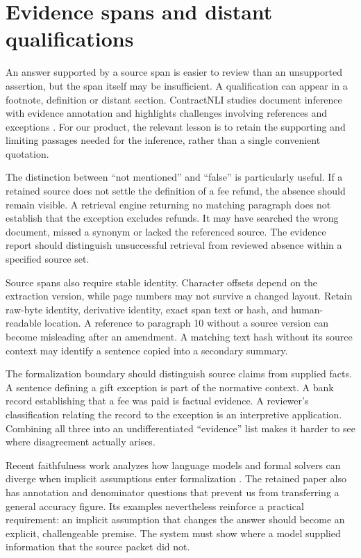 \documentclass[12pt,a4paper,oneside,openany]{book}
\begin{document}
\section{Evidence spans and distant qualifications}
\label{sec:languages-evidence}
An answer supported by a source span is easier to review than an unsupported
assertion, but the span itself may be insufficient. A qualification can appear
in a footnote, definition or distant section. ContractNLI studies document
inference with evidence annotation and highlights challenges involving
references and exceptions \citep[task, annotation and error-analysis sections]{contractnli2021}.
For our product, the relevant lesson is to retain the supporting and limiting
passages needed for the inference, rather than a single convenient quotation.

The distinction between ``not mentioned'' and ``false'' is particularly useful.
If a retained source does not settle the definition of a fee refund, the
absence should remain visible. A retrieval engine returning no matching
paragraph does not establish that the exception excludes refunds. It may have
searched the wrong document, missed a synonym or lacked the referenced source.
The evidence report should distinguish unsuccessful retrieval from reviewed
absence within a specified source set.

Source spans also require stable identity. Character offsets depend on the
extraction version, while page numbers may not survive a changed layout.
Retain raw-byte identity, derivative identity, exact span text or hash, and
human-readable location. A reference to paragraph 10 without a source version
can become misleading after an amendment. A matching text hash without its
source context may identify a sentence copied into a secondary summary.

The formalization boundary should distinguish source claims from supplied
facts. A sentence defining a gift exception is part of the normative context.
A bank record establishing that a fee was paid is factual evidence. A
reviewer's classification relating the record to the exception is an
interpretive application. Combining all three into an undifferentiated
``evidence'' list makes it harder to see where disagreement actually arises.

Recent faithfulness work analyzes how language models and formal solvers can
diverge when implicit assumptions enter formalization \citep{limits2026}.
The retained paper also has annotation and denominator questions that prevent
us from transferring a general accuracy figure. Its examples nevertheless
reinforce a practical requirement: an implicit assumption that changes the
answer should become an explicit, challengeable premise. The system must
show where a model supplied information that the source packet did not.
\end{document}

